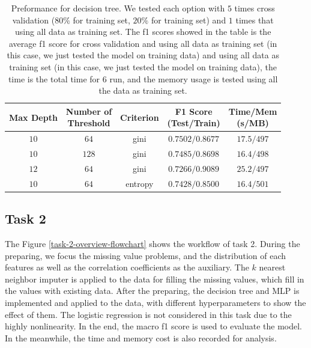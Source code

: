 \documentclass[11pt]{article}
\begin{document}
\begin{table}[H]
  \centering
  \begin{tabular}{|c|c|c|c|c|}
    \hline
    Max Depth & \makecell{Number of                                          \\ Threshold} & Criterion & \makecell{F1 Score \\ (Test/Train)} & \makecell{Time/Mem \\ (s/MB)}               \\
    \hline
    $10$      & $64$                & gini    & $0.7502/0.8677$ & $17.5/497$ \\
    \hline
    $10$      & $128$               & gini    & $0.7485/0.8698$ & $16.4/498$ \\
    \hline
    $12$      & $64$                & gini    & $0.7266/0.9089$ & $25.2/497$ \\
    \hline
    $10$      & $64$                & entropy & $0.7428/0.8500$ & $16.4/501$ \\
    \hline
  \end{tabular}
  \caption{Preformance for decision tree. We tested each option with $5$ times cross validation ($80\%$ for training set, $20\%$ for training set) and $1$ times that using all data as training set. The f1 scores showed in the table is the average f1 score for cross validation and using all data as training set (in this case, we just tested the model on training data) and using all data as training set (in this case, we just tested the model on training data), the time is the total time for $6$ run, and the memory usage is tested using all the data as training set.}
  \label{task-1-result-2}
\end{table}

\subsection{Task 2}

The Figure \ref{task-2-overview-flowchart} shows the workflow of task 2. During the preparing, we focus the missing  value problems, and the distribution of each features as well as the correlation coefficients as the auxiliary. The $k$ nearest neighbor imputer is applied to the data for filling the missing values, which fill in the values with existing data. After the preparing, the decision tree and MLP is implemented and applied to the data, with different hyperparameters to show the effect of them. The logistic regression is not considered in this task due to the highly nonlinearity. In the end, the macro f1 score is used to evaluate the model. In the meanwhile, the time and memory cost is also recorded for analysis.
\end{document}
